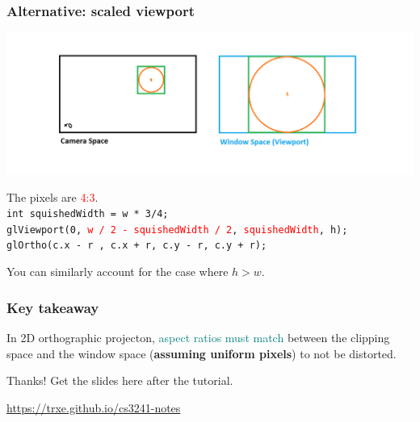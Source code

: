\documentclass{beamer}
\begin{document}
\begin{frame}
    \frametitle{Alternative: scaled viewport}

    \begin{center}
        \includegraphics[scale=0.3]{q7-cam-win-4.png}
    \end{center}

    \begin{tcolorbox}
        \small
        The pixels are \textcolor{red}{4:3}.\\
        \texttt{int squishedWidth = w * 3/4;}\\
        \texttt{glViewport(0, \textcolor{red}{w / 2 - squishedWidth / 2}, \textcolor{red}{squishedWidth}, h);}\\
        \texttt{glOrtho(c.x - r , c.x + r, c.y - r, c.y + r);}
    \end{tcolorbox}

    You can similarly account for the case where $h > w$.

\end{frame}

\begin{frame}
    \frametitle{Key takeaway}

    In 2D orthographic projecton, \textcolor{teal}{aspect ratios must match} between 
    the clipping space and the window space (\textbf{assuming uniform pixels})
    to not be distorted.

\end{frame}

\ThankYou
\begin{frame}
    Thanks! Get the slides here after the tutorial.\\
    \vspace{2em}
    \scalebox{3}{\faGithub}\par\bigskip
    \url{https://trxe.github.io/cs3241-notes}
\end{frame}
\end{document}
